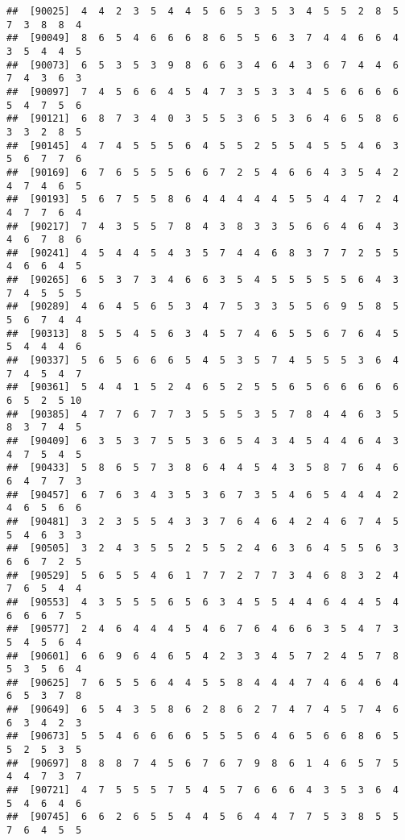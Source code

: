 \documentclass[
]{book}
\begin{document}
\begin{verbatim}
##  [90025]  4  4  2  3  5  4  4  5  6  5  3  5  3  4  5  5  2  8  5  7  3  8  8  4
##  [90049]  8  6  5  4  6  6  6  8  6  5  5  6  3  7  4  4  6  6  4  3  5  4  4  5
##  [90073]  6  5  3  5  3  9  8  6  6  3  4  6  4  3  6  7  4  4  6  7  4  3  6  3
##  [90097]  7  4  5  6  6  4  5  4  7  3  5  3  3  4  5  6  6  6  6  5  4  7  5  6
##  [90121]  6  8  7  3  4  0  3  5  5  3  6  5  3  6  4  6  5  8  6  3  3  2  8  5
##  [90145]  4  7  4  5  5  5  6  4  5  5  2  5  5  4  5  5  4  6  3  5  6  7  7  6
##  [90169]  6  7  6  5  5  5  6  6  7  2  5  4  6  6  4  3  5  4  2  4  7  4  6  5
##  [90193]  5  6  7  5  5  8  6  4  4  4  4  4  5  5  4  4  7  2  4  4  7  7  6  4
##  [90217]  7  4  3  5  5  7  8  4  3  8  3  3  5  6  6  4  6  4  3  4  6  7  8  6
##  [90241]  4  5  4  4  5  4  3  5  7  4  4  6  8  3  7  7  2  5  5  4  6  6  4  5
##  [90265]  6  5  3  7  3  4  6  6  3  5  4  5  5  5  5  5  6  4  3  7  4  5  5  5
##  [90289]  4  6  4  5  6  5  3  4  7  5  3  3  5  5  6  9  5  8  5  5  6  7  4  4
##  [90313]  8  5  5  4  5  6  3  4  5  7  4  6  5  5  6  7  6  4  5  5  4  4  4  6
##  [90337]  5  6  5  6  6  6  5  4  5  3  5  7  4  5  5  5  3  6  4  7  4  5  4  7
##  [90361]  5  4  4  1  5  2  4  6  5  2  5  5  6  5  6  6  6  6  6  6  5  2  5 10
##  [90385]  4  7  7  6  7  7  3  5  5  5  3  5  7  8  4  4  6  3  5  8  3  7  4  5
##  [90409]  6  3  5  3  7  5  5  3  6  5  4  3  4  5  4  4  6  4  3  4  7  5  4  5
##  [90433]  5  8  6  5  7  3  8  6  4  4  5  4  3  5  8  7  6  4  6  6  4  7  7  3
##  [90457]  6  7  6  3  4  3  5  3  6  7  3  5  4  6  5  4  4  4  2  4  6  5  6  6
##  [90481]  3  2  3  5  5  4  3  3  7  6  4  6  4  2  4  6  7  4  5  5  4  6  3  3
##  [90505]  3  2  4  3  5  5  2  5  5  2  4  6  3  6  4  5  5  6  3  6  6  7  2  5
##  [90529]  5  6  5  5  4  6  1  7  7  2  7  7  3  4  6  8  3  2  4  7  6  5  4  4
##  [90553]  4  3  5  5  5  6  5  6  3  4  5  5  4  4  6  4  4  5  4  6  6  6  7  5
##  [90577]  2  4  6  4  4  4  5  4  6  7  6  4  6  6  3  5  4  7  3  5  4  5  6  4
##  [90601]  6  6  9  6  4  6  5  4  2  3  3  4  5  7  2  4  5  7  8  5  3  5  6  4
##  [90625]  7  6  5  5  6  4  4  5  5  8  4  4  4  7  4  6  4  6  4  6  5  3  7  8
##  [90649]  6  5  4  3  5  8  6  2  8  6  2  7  4  7  4  5  7  4  6  6  3  4  2  3
##  [90673]  5  5  4  6  6  6  6  5  5  5  6  4  6  5  6  6  8  6  5  5  2  5  3  5
##  [90697]  8  8  8  7  4  5  6  7  6  7  9  8  6  1  4  6  5  7  5  4  4  7  3  7
##  [90721]  4  7  5  5  5  7  5  4  5  7  6  6  6  4  3  5  3  6  4  5  4  6  4  6
##  [90745]  6  6  2  6  5  5  4  4  5  6  4  4  7  7  5  3  8  5  5  7  6  4  5  5

\end{verbatim}
\end{document}
